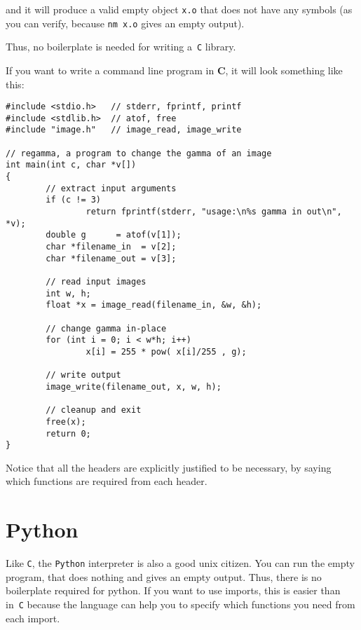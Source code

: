 and it will produce a valid empty object \verb+x.o+ that does not have any
symbols (as you can verify, because \verb+nm x.o+ gives an empty output).

Thus, no boilerplate is needed for writing a~\verb+C+ library.

If you want to write a command line program in {\bf C}, it will look
something like this:

\begin{verbatim}
#include <stdio.h>   // stderr, fprintf, printf
#include <stdlib.h>  // atof, free
#include "image.h"   // image_read, image_write

// regamma, a program to change the gamma of an image
int main(int c, char *v[])
{
        // extract input arguments
        if (c != 3)
                return fprintf(stderr, "usage:\n%s gamma in out\n", *v);
        double g      = atof(v[1]);
        char *filename_in  = v[2];
        char *filename_out = v[3];

        // read input images
        int w, h;
        float *x = image_read(filename_in, &w, &h);

        // change gamma in-place
        for (int i = 0; i < w*h; i++)
                x[i] = 255 * pow( x[i]/255 , g);

        // write output
        image_write(filename_out, x, w, h);

        // cleanup and exit
        free(x);
        return 0;
}
\end{verbatim}

Notice that all the headers are explicitly justified to be necessary, by
saying which functions are required from each header.


\section{Python}

Like \verb+C+, the \verb+Python+ interpreter is also a good unix citizen.
You can run the empty program, that does nothing and gives an empty output.
Thus, there is no boilerplate required for python.  If you want to use
imports, this is easier than in~\verb+C+ because the language can help you to
specify which functions you need from each import.

